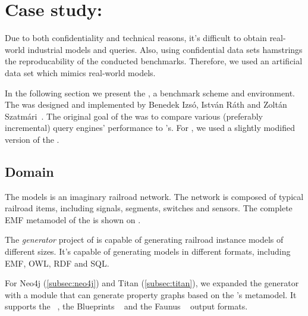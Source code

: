 \section{Case study: \tb{}}
\label{sec:trainbenchmark}

Due to both confidentiality and technical reasons, it's difficult to obtain real-world industrial models and queries. Also, using confidential data sets hamstrings the reproducability of the conducted benchmarks. Therefore, we used an artificial data set which mimics real-world models.  

In the following section we present the \textit{\tb{}}, a benchmark scheme and environment. The \tb{} was designed and implemented by Benedek Izsó, István Ráth and Zoltán Szatmári~\cite{Izso:2012:ODD:2428516.2428523}. The original goal of the \tb{} was to compare various (preferably incremental) query engines' performance to \eiq's. For \iqd, we used a slightly modified version of the \tb{}.

\subsection{Domain}


The \tb{} models is an imaginary railroad network. The network is composed of typical railroad items, including signals, segments, switches and sensors. The complete EMF metamodel of the \tb{} is shown on . 

The \textit{generator} project of \tb{} is capable of generating railroad instance models of different sizes. It's capable of generating models in different formats, including EMF, OWL, RDF and SQL. 

For Neo4j (\autoref{subsec:neo4j}) and Titan (\autoref{subsec:titan}), we expanded the generator with a module that can generate property graphs based on the \tb{}'s metamodel. It supports the \graphml{}~\cite{GraphML}, the Blueprints \graphson{}~\cite{BlueprintsGraphSON} and the Faunus \graphson{}~\cite{FaunusGraphSON} output formats.


